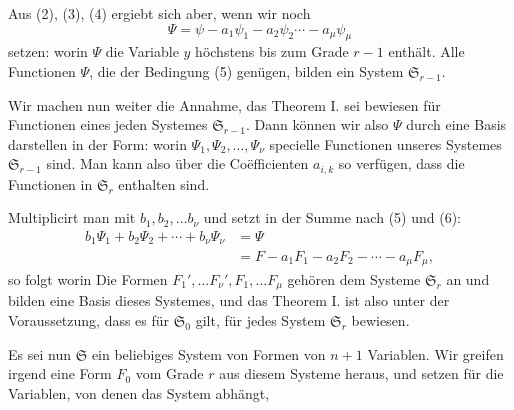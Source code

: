 Aus (2), (3), (4) ergiebt sich aber, wenn wir noch
\[ \Psi = \psi - a_1\psi_1 - a_2\psi_2 \cdots - a_\mu\psi_\mu \]
setzen:
worin $\Psi$ die Variable $y$ h\"ochstens bis zum Grade $r-1$ enth\"alt. Alle Functionen $\Psi$, die der Bedingung (5) gen\"ugen, bilden ein System $\mathfrak S_{r-1}$.

Wir machen nun weiter die Annahme, das Theorem I. sei bewiesen f\"ur Functionen eines jeden Systemes $\mathfrak S_{r-1}$. Dann k\"onnen wir also $\Psi$ durch eine Basis darstellen in der Form:
worin $\Psi_1,\Psi_2,\ldots,\Psi_\nu$ specielle Functionen unseres Systemes $\mathfrak S_{r-1}$ sind. Man kann also \"uber die Co\"efficienten $a_{i,k}$ so verf\"ugen, dass die Functionen
in $\mathfrak S_r$ enthalten sind.

Multiplicirt man mit $b_1,b_2,\ldots b_\nu$ und setzt in der Summe nach (5) und (6):
\[ \begin{aligned}
b_1\Psi_1+b_2\Psi_2+\cdots+b_\nu\Psi_\nu &= \Psi\\
&= F - a_1F_1-a_2F_2-\cdots-a_\mu F_\mu,
\end{aligned} \]
so folgt
worin
Die Formen $F_1',\ldots F_\nu', F_1,\ldots F_\mu$ geh\"oren dem Systeme $\mathfrak S_r$ an und bilden eine Basis dieses Systemes, und das Theorem I. ist also unter der Voraussetzung, dass es f\"ur $\mathfrak S_0$ gilt, f\"ur jedes System $\mathfrak S_r$ bewiesen.

Es sei nun $\mathfrak S$ ein beliebiges System von Formen von $n+1$ Variablen. Wir greifen irgend eine Form $F_0$ vom Grade $r$ aus diesem Systeme heraus, und setzen f\"ur die Variablen, von denen das System abh\"angt,
